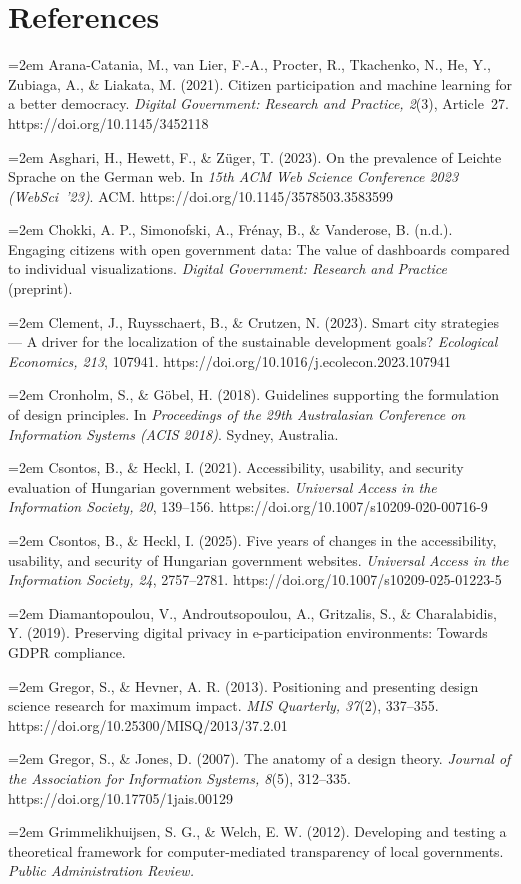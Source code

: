 \documentclass[11pt,a4paper]{article}
\newcommand{\refitem}[1]{\noindent\hangindent=2em\hangafter=1 #1\par\smallskip}
\begin{document}
\section*{References}
\refitem{Arana-Catania, M., van Lier, F.-A., Procter, R., Tkachenko, N., He, Y., Zubiaga, A., \& Liakata, M. (2021). Citizen participation and machine learning for a better democracy. \emph{Digital Government: Research and Practice, 2}(3), Article~27. https://doi.org/10.1145/3452118}
\refitem{Asghari, H., Hewett, F., \& Z\"uger, T. (2023). On the prevalence of Leichte Sprache on the German web. In \emph{15th ACM Web Science Conference 2023 (WebSci~'23)}. ACM. https://doi.org/10.1145/3578503.3583599}
\refitem{Chokki, A. P., Simonofski, A., Fr\'enay, B., \& Vanderose, B. (n.d.). Engaging citizens with open government data: The value of dashboards compared to individual visualizations. \emph{Digital Government: Research and Practice} (preprint).}
\refitem{Clement, J., Ruysschaert, B., \& Crutzen, N. (2023). Smart city strategies --- A driver for the localization of the sustainable development goals? \emph{Ecological Economics, 213}, 107941. https://doi.org/10.1016/j.ecolecon.2023.107941}
\refitem{Cronholm, S., \& G\"obel, H. (2018). Guidelines supporting the formulation of design principles. In \emph{Proceedings of the 29th Australasian Conference on Information Systems (ACIS 2018)}. Sydney, Australia.}
\refitem{Csontos, B., \& Heckl, I. (2021). Accessibility, usability, and security evaluation of Hungarian government websites. \emph{Universal Access in the Information Society, 20}, 139--156. https://doi.org/10.1007/s10209-020-00716-9}
\refitem{Csontos, B., \& Heckl, I. (2025). Five years of changes in the accessibility, usability, and security of Hungarian government websites. \emph{Universal Access in the Information Society, 24}, 2757--2781. https://doi.org/10.1007/s10209-025-01223-5}
\refitem{Diamantopoulou, V., Androutsopoulou, A., Gritzalis, S., \& Charalabidis, Y. (2019). Preserving digital privacy in e-participation environments: Towards GDPR compliance.}
\refitem{Gregor, S., \& Hevner, A. R. (2013). Positioning and presenting design science research for maximum impact. \emph{MIS Quarterly, 37}(2), 337--355. https://doi.org/10.25300/MISQ/2013/37.2.01}
\refitem{Gregor, S., \& Jones, D. (2007). The anatomy of a design theory. \emph{Journal of the Association for Information Systems, 8}(5), 312--335. https://doi.org/10.17705/1jais.00129}
\refitem{Grimmelikhuijsen, S. G., \& Welch, E. W. (2012). Developing and testing a theoretical framework for computer-mediated transparency of local governments. \emph{Public Administration Review.}}
\end{document}
